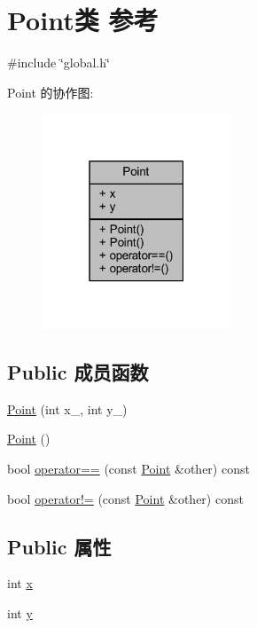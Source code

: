 \hypertarget{classPoint}{}\section{Point类 参考}
\label{classPoint}


{\ttfamily \#include \char`\"{}global.\+h\char`\"{}}



Point 的协作图\+:
\nopagebreak
\begin{figure}[H]
\begin{center}
\leavevmode
\includegraphics[width=159pt]{classPoint__coll__graph}
\end{center}
\end{figure}
\subsection*{Public 成员函数}
\begin{DoxyCompactItemize}
\item 
\hyperlink{classPoint_a7733108bf07d2ef72e1b55aed68eb2fc}{Point} (int x\+\_\+, int y\+\_\+)
\item 
\hyperlink{classPoint_ad92f2337b839a94ce97dcdb439b4325a}{Point} ()
\item 
bool \hyperlink{classPoint_a47584280150c7a90e86358b1edf8f810}{operator==} (const \hyperlink{classPoint}{Point} \&other) const 
\item 
bool \hyperlink{classPoint_aac8cc421b631fdeedfa084cf924c2164}{operator!=} (const \hyperlink{classPoint}{Point} \&other) const 
\end{DoxyCompactItemize}
\subsection*{Public 属性}
\begin{DoxyCompactItemize}
\item 
int \hyperlink{classPoint_a8c779e11e694b20e0946105a9f5de842}{x}
\item 
int \hyperlink{classPoint_a2e1b5fb2b2a83571f5c0bc0f66a73cf7}{y}
\end{DoxyCompactItemize}


